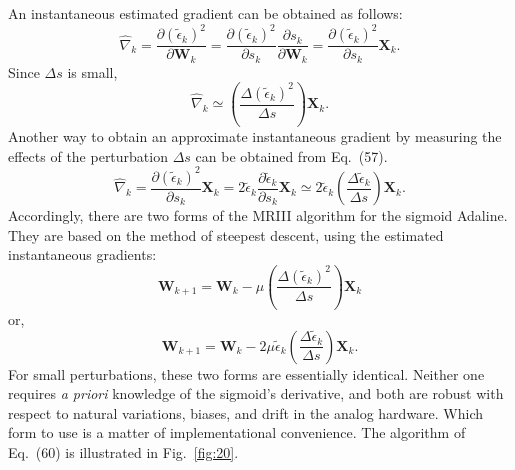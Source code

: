 \documentclass[10pt,twocolumn]{article}
\newcommand{\X}{\bm{X}}
\newcommand{\W}{\bm{W}}
\begin{document}
An instantaneous estimated gradient can be obtained as follows:
\begin{equation}
\hat{\nabla}_k = \frac{\partial(\tilde{\epsilon}_k)^2}{\partial\W_k}
= \frac{\partial(\tilde{\epsilon}_k)^2}{\partial s_k}\frac{\partial s_k}{\partial\W_k}
= \frac{\partial(\tilde{\epsilon}_k)^2}{\partial s_k}\X_k. \tag{57}
\end{equation}
Since $\Delta s$ is small,
\begin{equation}
\hat{\nabla}_k \simeq \left(\frac{\Delta(\tilde{\epsilon}_k)^2}{\Delta s}\right)\X_k. \tag{58}
\end{equation}
Another way to obtain an approximate instantaneous gradient by measuring the
effects of the perturbation $\Delta s$ can be obtained from Eq.~(57).
\begin{equation}
\hat{\nabla}_k = \frac{\partial(\tilde{\epsilon}_k)^2}{\partial s_k}\X_k
= 2\tilde{\epsilon}_k\frac{\partial\tilde{\epsilon}_k}{\partial s_k}\X_k
\simeq 2\tilde{\epsilon}_k\!\left(\frac{\Delta\tilde{\epsilon}_k}{\Delta s}\right)\X_k. \tag{59}
\end{equation}
Accordingly, there are two forms of the MRIII algorithm for the sigmoid Adaline.
They are based on the method of steepest descent, using the estimated instantaneous
gradients:
\begin{equation}
\W_{k+1} = \W_k - \mu\!\left(\frac{\Delta(\tilde{\epsilon}_k)^2}{\Delta s}\right)\X_k \tag{60}
\end{equation}
or,
\begin{equation}
\W_{k+1} = \W_k - 2\mu\tilde{\epsilon}_k\!\left(\frac{\Delta\tilde{\epsilon}_k}{\Delta s}\right)\X_k. \tag{61}
\end{equation}
For small perturbations, these two forms are essentially identical. Neither one
requires \textit{a priori} knowledge of the sigmoid's derivative, and both are
robust with respect to natural variations, biases, and drift in the analog
hardware. Which form to use is a matter of implementational convenience. The
algorithm of Eq.~(60) is illustrated in Fig.~\ref{fig:20}.
\end{document}
